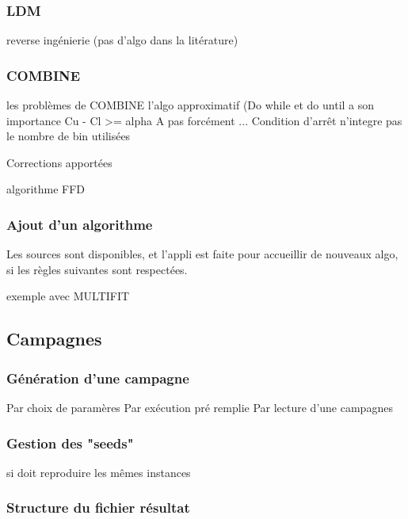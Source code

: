 \documentclass[a4paper,12pt]{report}
\theoremstyle{plain}				%
\theoremstyle{definition}				%
\begin{document}
\bigskip





\subsubsection{LDM}\label{subsubsec:LDM}

reverse ingénierie (pas d'algo dans la litérature)


\subsubsection{COMBINE}\label{subsubsec:COMBINE}

les problèmes de COMBINE 
l'algo approximatif (Do while et do until a son importance
Cu - Cl >= alpha A pas forcément ...
Condition d'arrêt n'integre pas le nombre de bin utilisées

Corrections apportées


algorithme FFD

\subsubsection{Ajout d'un algorithme}\label{subsubsec:Ajout d'un algorithme}
Les sources sont disponibles, et l'appli est faite pour accueillir de nouveaux algo, si les règles suivantes sont respectées.

exemple avec MULTIFIT


\subsection{Campagnes}\label{subsec:Campagnes}

\subsubsection{Génération d'une campagne}\label{subsubsec:Génération d'une campagne}
Par choix de paramères
Par exécution pré remplie
Par lecture d'une campagnes

\subsubsection{Gestion des "seeds"}\label{subsubsec:Gestion des "seeds"}
si doit reproduire les mêmes instances


\subsubsection{Structure du fichier résultat}\label{subsubsec:Structure du fichier résultat}
\end{document}
